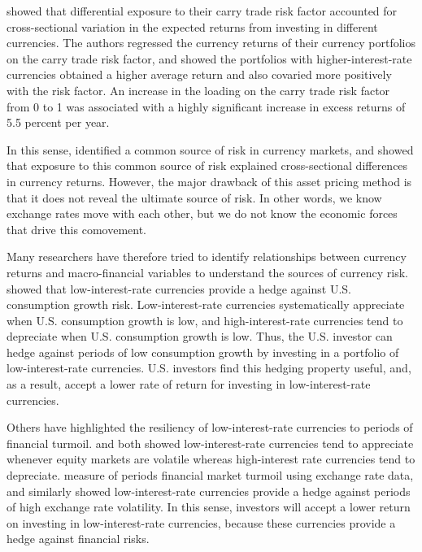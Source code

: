 \documentclass{ar-1col}
\begin{document}
\citet{LustigRoussanovVerdelhan2011} showed that differential exposure
to their carry trade risk factor accounted for cross-sectional variation 
in the expected returns from investing in different currencies. The 
authors regressed the currency returns of their currency portfolios 
on the carry trade risk factor, and showed the portfolios with 
higher-interest-rate currencies obtained a higher average return and 
also covaried more positively with the risk factor. An increase in 
the loading on the carry trade risk factor from 0 to 1 was associated 
with a highly significant increase in excess returns of 5.5 percent per year.

In this sense, \citet{LustigRoussanovVerdelhan2011} identified a
common source of risk in currency markets, and showed that exposure to
this common source of risk explained cross-sectional differences in
currency returns. However, the major drawback of this asset pricing
method is that it does not reveal the ultimate source of risk. In
other words, we know exchange rates move with each other, but we do
not know the economic forces that drive this comovement.

Many researchers have therefore tried to identify relationships between
currency returns and macro-financial variables to understand the
sources of currency risk. \citet{LustigVerdelhan2007} showed that
low-interest-rate currencies provide a hedge against U.S. consumption
growth risk. Low-interest-rate currencies systematically appreciate
when U.S. consumption growth is low, and high-interest-rate currencies
tend to depreciate when U.S. consumption growth is low. Thus, the U.S.
investor can hedge against periods of low consumption growth by
investing in a portfolio of low-interest-rate currencies. U.S.
investors find this hedging property useful, and, as a result, accept 
a lower rate of return for investing in low-interest-rate currencies.

Others have highlighted the resiliency of low-interest-rate currencies
to periods of financial turmoil. \citet{LustigRoussanovVerdelhan2011} and
\citet{CampbellMedeirosViceira2010} both showed low-interest-rate
currencies tend to appreciate whenever equity markets are volatile
whereas high-interest rate currencies tend to depreciate. 
\citet{Menkhoffetal2012} measure of periods financial market turmoil 
using exchange rate data, and similarly showed low-interest-rate 
currencies provide a hedge against periods of high exchange rate 
volatility. In this sense, investors will accept a lower return on 
investing in low-interest-rate currencies, because these currencies
provide a hedge against financial risks.
\end{document}
